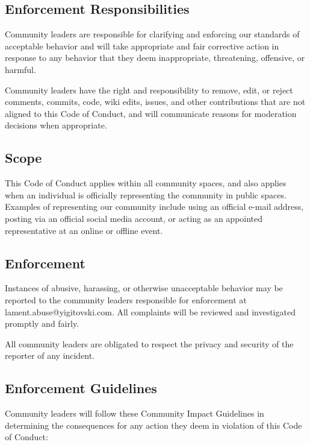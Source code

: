\subsection{Enforcement
Responsibilities}\label{enforcement-responsibilities}

Community leaders are responsible for clarifying and enforcing our
standards of acceptable behavior and will take appropriate and fair
corrective action in response to any behavior that they deem
inappropriate, threatening, offensive, or harmful.

Community leaders have the right and responsibility to remove, edit, or
reject comments, commits, code, wiki edits, issues, and other
contributions that are not aligned to this Code of Conduct, and will
communicate reasons for moderation decisions when appropriate.

\subsection{Scope}\label{scope}

This Code of Conduct applies within all community spaces, and also
applies when an individual is officially representing the community in
public spaces. Examples of representing our community include using an
official e-mail address, posting via an official social media account,
or acting as an appointed representative at an online or offline event.

\subsection{Enforcement}\label{enforcement}

Instances of abusive, harassing, or otherwise unacceptable behavior may
be reported to the community leaders responsible for enforcement at
lament.abuse@yigitovski.com. All complaints will be reviewed and
investigated promptly and fairly.

All community leaders are obligated to respect the privacy and security
of the reporter of any incident.

\subsection{Enforcement Guidelines}\label{enforcement-guidelines}

Community leaders will follow these Community Impact Guidelines in
determining the consequences for any action they deem in violation of
this Code of Conduct:

